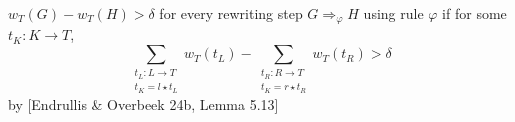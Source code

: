 \documentclass{beamer}
\begin{document}
\begin{frame}{ $w_T(G) - w_T(H) > \delta$ for every rewriting step $G \Rightarrow_\varphi H$ using rule $\varphi$ if}
for some $t_K: K \rightarrow T$,
$$ \sum_{\substack{t_L: L \rightarrow T\\ t_K = l \star t_L}}
        w_T(t_L) - \sum_{\substack{t_R: R \rightarrow T\\ t_K = r \star t_R}}
            w_T(t_R) > \delta $$ 
  by [Endrullis \& Overbeek 24b, Lemma 5.13]
\end{frame}
\end{document}
